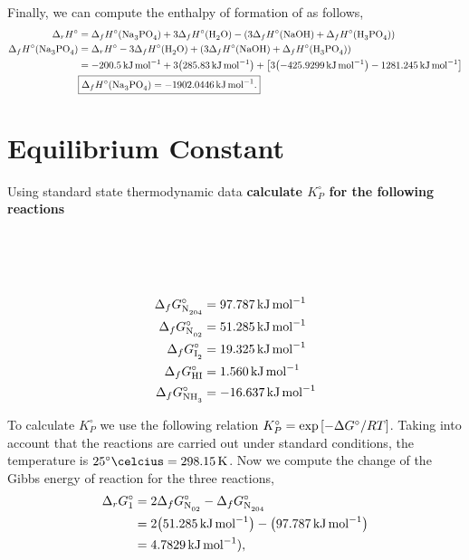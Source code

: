 \documentclass[main.tex]{subfiles}
\begin{document}
Finally, we can compute the enthalpy of formation of  as follows,
\begin{align*}
    \Delta_r H^\circ &= \Delta_f H^\circ\qty(\ce{Na3PO4})+3\Delta_f H^\circ\qty(\ce{H2O}) - \qty(3\Delta_f H^\circ\qty(\ce{NaOH})+\Delta_f H^\circ\qty(\ce{H3PO4})) \\
    \Delta_f H^\circ\qty(\ce{Na3PO4}) &= \Delta_r H^\circ - 3\Delta_f H^\circ\qty(\ce{H2O}) + \qty(3\Delta_f H^\circ\qty(\ce{NaOH})+\Delta_f H^\circ\qty(\ce{H3PO4})) \\
    &= -\SI{200.5}{\kilo\joule\per\mol} +3\qty(\SI{285.83}{\kilo\joule\per\mol}) + \qty[ 3\qty(-\SI{425.9299}{\kilo\joule\per\mol})  -\SI{1281.245}{\kilo\joule\per\mol} ] \\
    &\boxed{\Delta_f H^\circ\qty(\ce{Na3PO4})=-\SI{1902.0446}{\kilo\joule\per\mol}.}
\end{align*}

\section{Equilibrium Constant}

Using standard state thermodynamic data \textbf{calculate $K^\circ_P$ for the following reactions}

\begin{minipage}[c]{\textwidth}
\begin{minipage}[c]{0.45\textwidth}
     \\
     \\
     \\
\end{minipage}
\vrule
\begin{minipage}[c]{0.45\textwidth}
\begin{align*}
    \Delta_f G^\circ_{\ce{N204}} &= \SI{97.787}{\kilo\joule\per\mol} \\
    \Delta_f G^\circ_{\ce{N02}} &= \SI{51.285}{\kilo\joule\per\mol} \\
    \Delta_f G^\circ_{\ce{I2}} &= \SI{19.325}{\kilo\joule\per\mol} \\
    \Delta_f G^\circ_{\ce{HI}} &= \SI{1.560}{\kilo\joule\per\mol} \\
    \Delta_f G^\circ_{\ce{NH3}} &= -\SI{16.637}{\kilo\joule\per\mol} 
\end{align*} 
\end{minipage}
\end{minipage}

To calculate $K^\circ_P$ we use the following relation $K^\circ_P=\exp\qty[-\Delta G^\circ/RT]$.
Taking into account that the reactions are carried out under standard conditions, the temperature is $25^\circ\SI{}{\celcius}=\SI{298.15}{\kelvin}$.
Now we compute the change of the Gibbs energy of reaction for the three reactions,
\begin{align*}
    \Delta_r G^\circ_1 &= 2\Delta_f G^\circ_{\ce{N02}} - \Delta_f G^\circ_{\ce{N204}} \\
    &= 2\qty(\SI{51.285}{\kilo\joule\per\mol}) - \qty(\SI{97.787}{\kilo\joule\per\mol}) \\
    &= \SI{4.7829}{\kilo\joule\per\mol}),
\end{align*}
\end{document}

